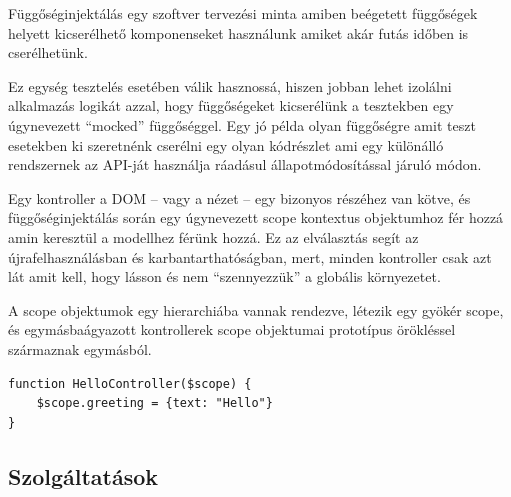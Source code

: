 Függőséginjektálás egy szoftver tervezési minta amiben beégetett függőségek helyett kicserélhető komponenseket használunk amiket akár futás időben is cserélhetünk. 

Ez egység tesztelés esetében válik hasznossá, hiszen jobban lehet izolálni alkalmazás logikát azzal, hogy függőségeket kicserélünk a tesztekben egy úgynevezett ``mocked'' függőséggel. Egy jó példa olyan függőségre amit teszt esetekben ki szeretnénk cserélni egy olyan kódrészlet ami egy különálló rendszernek az API-ját használja ráadásul állapotmódosítással járuló módon. 

Egy kontroller a DOM -- vagy a nézet -- egy bizonyos részéhez van kötve, és függőséginjektálás során egy úgynevezett scope kontextus objektumhoz fér hozzá amin keresztül a modellhez férünk hozzá. Ez az elválasztás segít az újrafelhasználásban és karbantarthatóságban, mert, minden kontroller csak azt lát amit kell, hogy lásson és nem ``szennyezzük'' a globális környezetet. 

A scope objektumok egy hierarchiába vannak rendezve, létezik egy gyökér scope, és egymásbaágyazott kontrollerek scope objektumai prototípus örökléssel származnak egymásból.  
 
\begin{lstlisting}
function HelloController($scope) {
    $scope.greeting = {text: "Hello"}
}
\end{lstlisting}

\subsection{Szolgáltatások}
